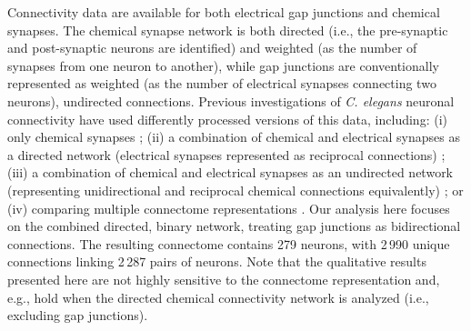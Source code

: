 \documentclass[10pt,letterpaper]{article}
\begin{document}
Connectivity data are available for both electrical gap junctions and chemical synapses.
The chemical synapse network is both directed (i.e., the pre-synaptic and post-synaptic neurons are identified) and weighted (as the number of synapses from one neuron to another), while gap junctions are conventionally represented as weighted (as the number of electrical synapses connecting two neurons), undirected connections.
Previous investigations of \emph{C. elegans} neuronal connectivity have used differently processed versions of this data, including:
(i) only chemical synapses \cite{Kashtan:2004ev};
(ii) a combination of chemical and electrical synapses as a directed network (electrical synapses represented as reciprocal connections) \cite{Azulay:2016cg, Kim:2016gl};
(iii) a combination of chemical and electrical synapses as an undirected network (representing unidirectional and reciprocal chemical connections equivalently) \cite{Towlson2013, Kim:2014bu, Pavlovic:2014gx, van2017guiding};
or (iv) comparing multiple connectome representations \cite{Pan:2010jt}.
Our analysis here focuses on the combined directed, binary network, treating gap junctions as bidirectional connections.
The resulting connectome contains 279 neurons, with 2\,990 unique connections linking 2\,287 pairs of neurons.
Note that the qualitative results presented here are not highly sensitive to the connectome representation and, e.g., hold when the directed chemical connectivity network is analyzed (i.e., excluding gap junctions).
\end{document}
